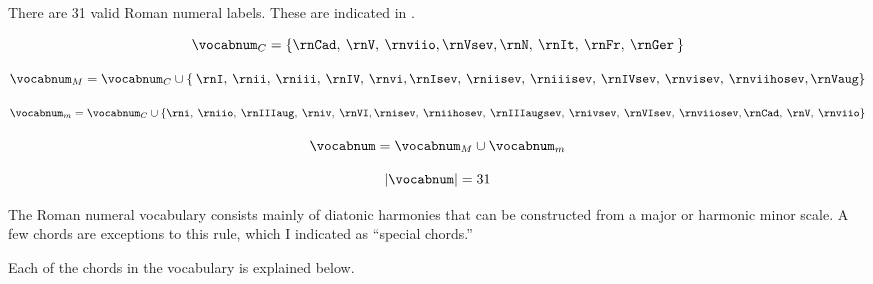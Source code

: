 
There are 31 valid Roman numeral labels. These are indicated
in .



\begin{equation}
    \vocabnum_{C} = \{ \rnCad, \: \rnV, \: \rnviio,
                \rnVsev, \rnN, \: \rnIt, \: \rnFr, \: \rnGer \: \}
\end{equation}

\begin{equation}
    \vocabnum_{M} = \vocabnum_{C} \cup \{ \: \rnI, \: \rnii, \: \rniii, \: \rnIV, \: \rnvi,
                \rnIsev, \: \rniisev, \: \rniiisev, \: \rnIVsev, \: 
                \rnvisev, \: \rnviihosev, \rnVaug \}
\end{equation}


\begin{equation}
    \vocabnum_{m} = \vocabnum_{C} \cup  \{ \rni, \: \rniio, \: \rnIIIaug, \: \rniv, \: \rnVI,
                \rnisev, \: \rniihosev, \: \rnIIIaugsev, \: \rnivsev, \: \rnVIsev, \: \rnviiosev,
                \rnCad, \: \rnV, \: \rnviio \}
\end{equation}

\begin{equation}
    \vocabnum = \vocabnum_{M} \cup \vocabnum_{m}
\end{equation}

\begin{equation}
    | \vocabnum | = 31
\end{equation}

                

The Roman numeral vocabulary consists mainly of diatonic
harmonies that can be constructed from a major or harmonic
minor scale. A few chords are exceptions to this rule, \:
which I indicated as ``special chords.''

Each of the chords in the vocabulary is explained below.


